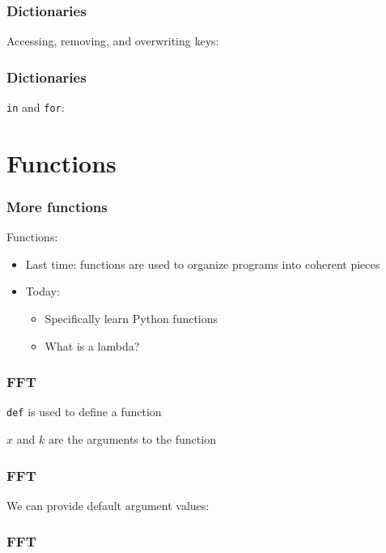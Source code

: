 \documentclass{beamer}
\begin{document}
\begin{frame}
\frametitle{Dictionaries}

Accessing, removing, and overwriting keys:


\end{frame}

\begin{frame}
\frametitle{Dictionaries}

\texttt{in} and \texttt{for}:


\end{frame}

\section{Functions}

\begin{frame}
\frametitle{More functions}

Functions:
\begin{itemize}
\setlength{\itemsep}{0.15in}
\item{Last time: functions are used to organize programs into coherent pieces}
\item{Today:
\begin{itemize}
  \setlength{\itemsep}{0.1in}
  \item{Specifically learn Python functions}
  \item{What is a lambda?}
\end{itemize}
}
\end{itemize}

\end{frame}

\begin{frame}
\frametitle{FFT}
\texttt{def} is used to define a function


$x$ and $k$ are the arguments to the function
\end{frame}

\begin{frame}
\frametitle{FFT}

We can provide default argument values:


\end{frame}


\begin{frame}
\frametitle{FFT}


\end{frame}
\end{document}
